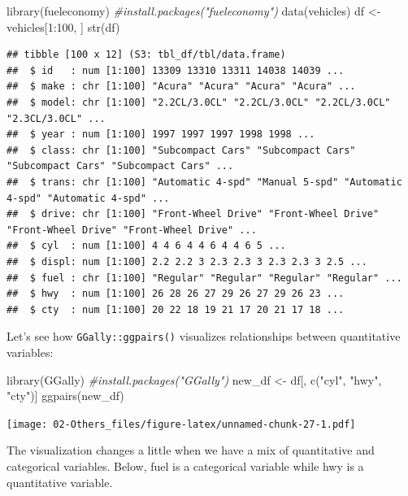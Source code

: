\documentclass[
]{book}
\newenvironment{Shaded}{\begin{snugshade}}{\end{snugshade}}
\newcommand{\CommentTok}[1]{\textcolor[rgb]{0.56,0.35,0.01}{\textit{#1}}}
\newcommand{\DecValTok}[1]{\textcolor[rgb]{0.00,0.00,0.81}{#1}}
\newcommand{\FunctionTok}[1]{\textcolor[rgb]{0.00,0.00,0.00}{#1}}
\newcommand{\NormalTok}[1]{#1}
\newcommand{\OtherTok}[1]{\textcolor[rgb]{0.56,0.35,0.01}{#1}}
\newcommand{\SpecialCharTok}[1]{\textcolor[rgb]{0.00,0.00,0.00}{#1}}
\newcommand{\StringTok}[1]{\textcolor[rgb]{0.31,0.60,0.02}{#1}}
\begin{document}
\begin{Shaded}
\begin{Highlighting}[]
\FunctionTok{library}\NormalTok{(fueleconomy)  }\CommentTok{\#install.packages("fueleconomy")}
\FunctionTok{data}\NormalTok{(vehicles)}
\NormalTok{df }\OtherTok{\textless{}{-}}\NormalTok{ vehicles[}\DecValTok{1}\SpecialCharTok{:}\DecValTok{100}\NormalTok{, ]}
\FunctionTok{str}\NormalTok{(df)}
\end{Highlighting}
\end{Shaded}

\begin{verbatim}
## tibble [100 x 12] (S3: tbl_df/tbl/data.frame)
##  $ id   : num [1:100] 13309 13310 13311 14038 14039 ...
##  $ make : chr [1:100] "Acura" "Acura" "Acura" "Acura" ...
##  $ model: chr [1:100] "2.2CL/3.0CL" "2.2CL/3.0CL" "2.2CL/3.0CL" "2.3CL/3.0CL" ...
##  $ year : num [1:100] 1997 1997 1997 1998 1998 ...
##  $ class: chr [1:100] "Subcompact Cars" "Subcompact Cars" "Subcompact Cars" "Subcompact Cars" ...
##  $ trans: chr [1:100] "Automatic 4-spd" "Manual 5-spd" "Automatic 4-spd" "Automatic 4-spd" ...
##  $ drive: chr [1:100] "Front-Wheel Drive" "Front-Wheel Drive" "Front-Wheel Drive" "Front-Wheel Drive" ...
##  $ cyl  : num [1:100] 4 4 6 4 4 6 4 4 6 5 ...
##  $ displ: num [1:100] 2.2 2.2 3 2.3 2.3 3 2.3 2.3 3 2.5 ...
##  $ fuel : chr [1:100] "Regular" "Regular" "Regular" "Regular" ...
##  $ hwy  : num [1:100] 26 28 26 27 29 26 27 29 26 23 ...
##  $ cty  : num [1:100] 20 22 18 19 21 17 20 21 17 18 ...
\end{verbatim}

Let's see how \texttt{GGally::ggpairs()} visualizes relationships between quantitative variables:

\begin{Shaded}
\begin{Highlighting}[]
\FunctionTok{library}\NormalTok{(GGally) }\CommentTok{\#install.packages("GGally")}
\NormalTok{new\_df }\OtherTok{\textless{}{-}}\NormalTok{ df[, }\FunctionTok{c}\NormalTok{(}\StringTok{"cyl"}\NormalTok{, }\StringTok{"hwy"}\NormalTok{, }\StringTok{"cty"}\NormalTok{)]}
\FunctionTok{ggpairs}\NormalTok{(new\_df)}
\end{Highlighting}
\end{Shaded}

\texttt{[image: 02-Others\_files/figure-latex/unnamed-chunk-27-1.pdf]}

The visualization changes a little when we have a mix of quantitative and categorical variables. Below, fuel is a categorical variable while hwy is a quantitative variable.
\end{document}
